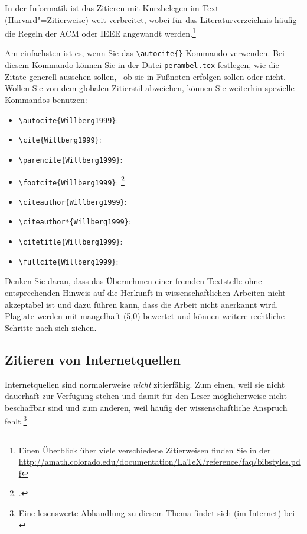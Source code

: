 In der Informatik ist das Zitieren mit Kurzbelegen im Text (Harvard"=Zitierweise) weit verbreitet, wobei für das Literaturverzeichnis häufig die Regeln der \acs{ACM} oder \acs{IEEE} angewandt werden.\footnote{Einen Überblick über viele verschiedene Zitierweisen finden Sie in der \url{http://amath.colorado.edu/documentation/LaTeX/reference/faq/bibstyles.pdf}}

Am einfachsten ist es, wenn Sie das \verb+\autocite{}+-Kommando verwenden. Bei diesem Kommando können Sie in der Datei \texttt{perambel.tex} festlegen, wie die Zitate generell aussehen sollen, \zb \ ob sie in Fußnoten erfolgen sollen oder nicht. Wollen Sie von dem globalen Zitierstil abweichen, können Sie weiterhin spezielle Kommandos benutzen:

\begin{itemize}
	\item \verb+\autocite{Willberg1999}+: \autocite{Willberg1999}
	\item \verb+\cite{Willberg1999}+: \cite{Willberg1999}
	\item \verb+\parencite{Willberg1999}+: \parencite{Willberg1999}
	\item \verb+\footcite{Willberg1999}+: \footcite{Willberg1999}
	\item \verb+\citeauthor{Willberg1999}+: \citeauthor{Willberg1999}
	\item \verb+\citeauthor*{Willberg1999}+: \citeauthor*{Willberg1999}
	\item \verb++: \citetitle{Willberg1999}
	\item \verb++: \fullcite{Willberg1999}
\end{itemize}

Denken Sie daran, dass das Übernehmen einer fremden Textstelle ohne entsprechenden Hinweis auf die Herkunft in wissenschaftlichen Arbeiten nicht akzeptabel ist und dazu führen kann, dass die Arbeit nicht anerkannt wird. Plagiate werden mit mangelhaft (5,0) bewertet und können weitere rechtliche Schritte nach sich ziehen.


\subsection{Zitieren von Internetquellen}

Internetquellen sind normalerweise \textit{nicht} zitierfähig. Zum einen, weil sie nicht dauerhaft zur Verfügung stehen und damit für den Leser möglicherweise nicht beschaffbar sind und zum anderen, weil häufig der wissenschaftliche Anspruch fehlt.\footnote{Eine lesenswerte Abhandlung zu diesem Thema findet sich (im Internet) bei \cite{Weber2006}}

